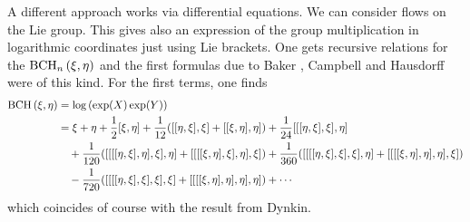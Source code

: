 A different approach works via differential equations. We can consider flows 
on the Lie group. This gives also an expression of the group multiplication 
in logarithmic coordinates just using Lie brackets. One gets recursive 
relations for the $\mathrm{BCH}_{n}\left(\xi, \eta\right)$ and the first formulas due to 
Baker \cite{baker:1905a}, Campbell \cite{campbell:1896a, campbell:1897a} and 
Hausdorff \cite{hausdorff:1906a} were of this kind. For the first terms, one 
finds
\begin{align}
	\nonumber
	\mathrm{BCH}\left(\xi, \eta\right)
	& =
	\log \left( \exp(X) \exp(Y) \right)
	\\
	\nonumber
	& =
	\xi + \eta
	+ \frac{1}{2} [\xi, \eta]
	+ \frac{1}{12} ( [[\eta, \xi], \xi]  + [[\xi, \eta], \eta] )
	+ \frac{1}{24} [[[\eta, \xi], \xi], \eta]
	\\
	\nonumber
	& \quad
	+ \frac{1}{120}
	(
		[[[[\eta, \xi], \eta], \xi], \eta] + 
		[[[[\xi, \eta], \xi], \eta], \xi]
	)
	+ \frac{1}{360}
	(
		[[[[\eta, \xi], \xi], \xi], \eta] + 
		[[[[\xi, \eta], \eta], \eta], \xi]
	)
	\\
	\label{Alg:BCHSeriesLong}
	& \quad
	- \frac{1}{720}
	(
		[[[[\eta, \xi], \xi], \xi], \xi] + 
		[[[[\xi, \eta], \eta], \eta], \eta]
	)
	+ \cdots
\end{align}
which coincides of course with the result from Dynkin.


